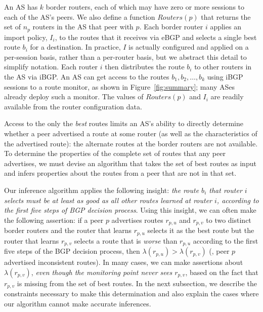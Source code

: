 An AS has $k$ border routers, each of which may have zero or more
sessions to each of the AS's peers.  We also define a function
$\mathit{Routers}(p)$ that returns the set of $n_p$ routers in the AS
that peer with $p$.  Each border router $i$ applies an import policy,
$I_i$, to the routes that it receives via eBGP and selects a single
best route $b_i$ for a destination.  In practice, $I$ is actually
configured and applied on a per-session basis, rather than a
per-router basis, but we abstract this detail to simplify
notation. Each router $i$ then distributes the route $b_i$ to other
routers in the AS via iBGP.  An AS can get access to the routes $b_1,
b_2, \ldots, b_k$ using iBGP sessions to a route monitor, as shown in
Figure~\ref{fig:summary}; many ASes already deploy such a monitor.
The values of $\mathit{Routers}(p)$ and $I_i$ are readily available
from the router configuration data.


Access to the only the {\em best\/} routes limits an AS's ability to
directly determine whether a peer advertised a route at some
router (as well as the characteristics of the advertised route): the
alternate routes at the border routers are not available.  To
determine the properties of the complete set of routes that any peer
advertises, we must devise an algorithm that takes the set
of best routes as input and infers properties about the routes
from a peer that are not in that set.

Our inference algorithm applies the following insight: {\em the route
  $b_i$ that router $i$ selects must be at 
least as good as all other routes learned at router $i$, according to
the first five steps of BGP decision process}.  Using this insight, we
can often make the following assertion: if a peer $p$ advertises routes
$r_{p,u}$ and $r_{p,v}$ to two distinct border routers and the
router that learns $r_{p,u}$ selects it as the best route but the router
that learns $r_{p,v}$ selects a route that is {\em worse} than $r_{p,u}$
according to the first five steps of the BGP decision process, then
$\lambda(r_{p,u}) > \lambda(r_{p,v})$ (\ie, peer $p$ advertised
inconsistent routes).
In many cases, we can make assertions about
$\lambda(r_{p,v})$, {\em even though the monitoring point never sees
$r_{p,v}$}, based on the fact that $r_{p,v}$ is missing from the set of
best routes.  In the next subsection, we describe the constraints necessary
to make this determination and also explain the cases where our
algorithm cannot make accurate inferences.

